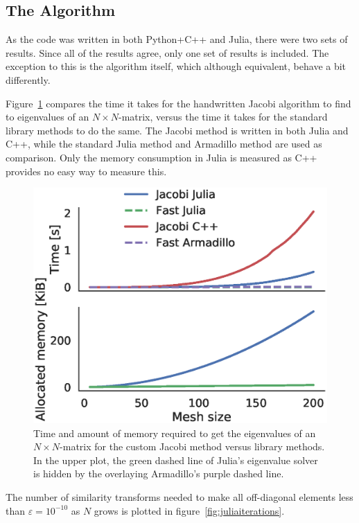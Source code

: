 \documentclass[aps,reprint]{revtex4-1}
\begin{document}
\subsection{The Algorithm}
\label{sec:algorithm}

As the code was written in both Python+C++ and Julia, there were two sets of
results. Since all of the results agree, only one set of results is included.
The exception to this is the algorithm itself, which although equivalent, behave
a bit differently.

Figure~\ref{fig:juliatiming} compares the time it takes for the handwritten
Jacobi algorithm to find to eigenvalues of an \(N\times N\)-matrix, versus the
time it takes for the standard library methods to do the same. The Jacobi method
is written in both Julia and C++, while the standard Julia method and Armadillo
method are used as comparison. Only the memory consumption in Julia is measured
as C++ provides no easy way to measure this.

\begin{figure}[H]
  \centering
  \includegraphics[width=\columnwidth]{figures/juliatime.eps}
  \caption{\label{fig:juliatiming} Time and amount of memory required to get the eigenvalues of an
    \(N\times N\)-matrix for the custom Jacobi method versus library methods. In
  the upper plot, the green dashed line of Julia's eigenvalue solver is hidden
  by the overlaying Armadillo's purple dashed line.}
\end{figure}

The number of similarity transforms needed to make all off-diagonal elements
less than \(\varepsilon=10^{-10}\) as \(N\) grows is plotted in
figure~\ref{fig:juliaiterations}.
\end{document}
